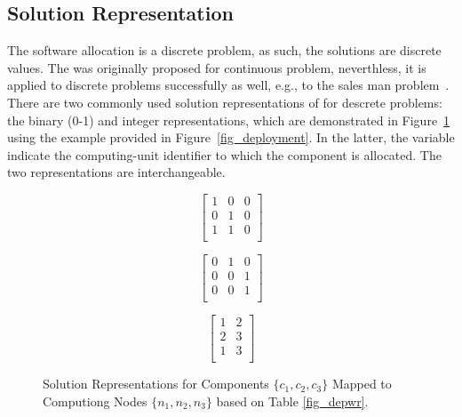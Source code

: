 \subsection{Solution Representation}
The software allocation is a discrete problem, as such, the solutions are discrete values. The \pso{} was originally proposed for continuous problem, neverthless, it is applied to discrete problems successfully as well, e.g., to the sales man problem~\cite{Clerc2000DiscreteProblem}. There are two commonly used solution representations of \pso{} for descrete problems: the binary (0-1) and integer representations, which are demonstrated in Figure~\ref{fig_solutionrep} using the example provided in Figure~\ref{fig_deployment}. In the latter, the variable indicate the computing-unit identifier to which the component is allocated. The two representations are interchangeable.
\begin{figure}
	\centering
		\begin{minipage}{.5\textwidth}
		\centering
				\begin{minipage}{.3\textwidth}
				\centering
				\begin{equation*}
				\begin{bmatrix} 
				1 & 0& 0\\
				0 & 1& 0\\
				1 &  1& 0\\
				\end{bmatrix}
				\end{equation*}
			\end{minipage}%
			\begin{minipage}{.3\textwidth}
				\centering
				\begin{equation*}
				\begin{bmatrix} 
				0 & 1& 0\\
				0 & 0& 1\\
				0 &  0& 1\\
				\end{bmatrix}
				\end{equation*}
			\end{minipage}
		\label{fig_binary}
	\end{minipage}
	\begin{minipage}{.4\textwidth}
		\centering
		\begin{equation*}
		\begin{bmatrix} 
		1 & 2\\
		2& 3\\
		1& 3\\
		\end{bmatrix}
		\end{equation*}
		\label{fig_integer}
	\end{minipage}
		\caption{Solution Representations for Components $\{c_1,c_2,c_3\}$ Mapped to Computiong Nodes $\{n_1,n_2,n_3\}$ based on Table \ref{fig_depwr}.}
		\label{fig_solutionrep}
\end{figure}

